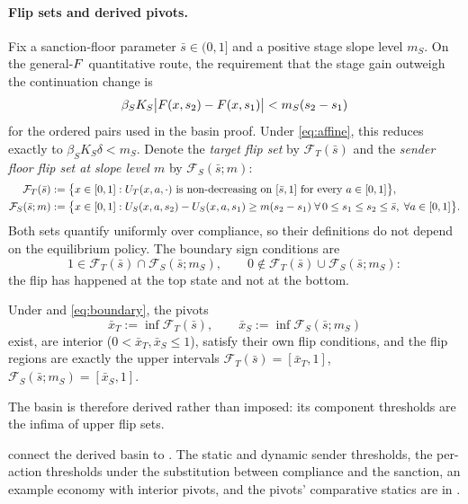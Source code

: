 \paragraph{Flip sets and derived pivots.}
Fix a sanction-floor parameter $\bar s\in(0,1]$ and a positive stage
slope level $m_S$. On the general-$F$ quantitative route, the
requirement that the stage gain outweigh the continuation change is
\[
\beta_S K_S\bigl|F(x,s_2)-F(x,s_1)\bigr|
<m_S(s_2-s_1)
\]
for the ordered pairs used in the basin proof. Under
\eqref{eq:affine}, this reduces exactly to
$\beta_S K_S\delta<m_S$. Denote the \emph{target flip set} by
$\mathcal F_T(\bar s)$ and the \emph{sender floor flip set at slope
level $m$} by $\mathcal F_S(\bar s;m)$:
\begin{align}
\mathcal F_T(\bar s)&:=\bigl\{x\in[0,1] :
U_T(x,a,\cdot)\text{ is non-decreasing on }[\bar s,1]
\text{ for every }a\in[0,1]\bigr\},
\label{eq:FT-def}\\
\mathcal F_S(\bar s;m)&:=\bigl\{x\in[0,1] :
U_S(x,a,s_2)-U_S(x,a,s_1)\ge m(s_2-s_1)
\;\forall\,0\le s_1\le s_2\le\bar s,\;\forall a\in[0,1]\bigr\}.
\label{eq:FS-def}
\end{align}
Both sets quantify uniformly over compliance, so their definitions do
not depend on the equilibrium policy. The boundary sign conditions are
\begin{equation}
1\in\mathcal F_T(\bar s)\cap\mathcal F_S(\bar s;m_S),
\qquad
0\notin\mathcal F_T(\bar s)\cup\mathcal F_S(\bar s;m_S):
\label{eq:boundary}
\end{equation}
the flip has happened at the top state and not at the bottom.

\begin{proposition}
\label{prop:tipping}
Under  and \eqref{eq:boundary}, the pivots
\begin{equation}
\bar x_T:=\inf\mathcal F_T(\bar s),
\qquad
\bar x_S:=\inf\mathcal F_S(\bar s;m_S)
\end{equation}
exist, are interior ($0<\bar x_T,\bar x_S\le1$), satisfy their own
flip conditions, and the flip regions are exactly the upper
intervals
$\mathcal F_T(\bar s)=[\bar x_T,1]$,
$\mathcal F_S(\bar s;m_S)=[\bar x_S,1]$.
\end{proposition}

The basin is therefore derived rather than imposed: its component
thresholds are the infima of upper flip sets.

 connect the derived basin to
. The static and dynamic sender
thresholds, the per-action thresholds under the substitution between compliance and the sanction, an example
economy with interior pivots, and the pivots' comparative statics are in
.

